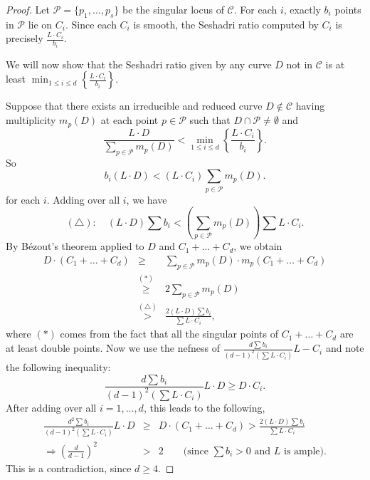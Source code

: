 \documentclass[12pt,reqno]{amsart}
\theoremstyle{plain}
\numberwithin{equation}{section}
\theoremstyle{definition}
\begin{document}
	\begin{proof}
	 Let $\mathcal{P} = \{p_{1}, \ldots, p_{s}\}$ be the singular locus of  $\mathcal{C}$. For each $i$, exactly $b_i$ points in $\mathcal{P}$  lie on $C_i$. Since each $C_i$ is smooth, the Seshadri ratio computed by $C_i$ is precisely 
	  $ \frac{L\cdot C_i}{b_i}$. %
	 

  We will now show that the Seshadri ratio given by any curve $D$ not in $\mathcal{C}$ is at least $\min_{1\le i\le d}
  {\left\{\frac{L\cdot C_i}{b_i}\right\}}$. 
  
	 Suppose that there exists an irreducible and reduced curve $D\notin \mathcal{C}$ having multiplicity $m_{p}(D)$ at each point $p \in \mathcal{P}$ such that $D \cap \mathcal{P} \ne \emptyset$ and 
		$$\frac{L \cdot D}{\sum_{p \in \mathcal{P}} m_{p}(D)} < \min_{1\le i \le d}\left\{\frac{L\cdot C_i}{b_i}\right\}.$$
So 
                $$b_i(L \cdot D)  < (L\cdot C_i) \sum_{p \in \mathcal{P}} m_{p}(D).$$ for each $i$. 
Adding over all $i$, we have 
		$$(\triangle) : \quad (L \cdot D)\sum b_i < \left(\sum_{p \in \mathcal{P}} m_{p}(D)\right)\sum L\cdot C_i.$$
		By B\'ezout's theorem applied to $D$ and $C_1+\dots+C_d$, we obtain
		\begin{eqnarray*}
		 D\cdot (C_{1}+ \ldots + C_{d}) &\geq& \sum_{p \in \mathcal{P}}m_{p}(D)\cdot m_{p}(C_{1}+ \ldots + C_{d})\\
		&\stackrel{(*)}{\geq}& 2\sum_{p \in \mathcal{P}} m_{p}(D) \\
		&\stackrel{(\triangle)}{>}& \frac{2(L \cdot D)\sum b_i}{\sum L\cdot C_i},
		\end{eqnarray*}
		where $(*)$ comes from the fact that all the singular points of $C_{1}+ \ldots + C_{d}$ are at least double points. Now we use the nefness 
		of $\frac{d\sum b_i}{(d-1)^2(\sum L\cdot C_i)}L-C_i$ and note the following  inequality: 
		\[
		\frac{d\sum b_i}{(d-1)^2(\sum L\cdot C_i)}L\cdot D \geq D\cdot C_i.
		\] 
		After adding over all $i=1,...,d$, this leads to the following, 
		\begin{eqnarray*}
			\frac{d^2\sum b_i}{(d-1)^2(\sum L\cdot C_i)}L\cdot D &\geq&  D\cdot (C_{1}+ \ldots + C_{d}) > \frac{2(L \cdot D)\sum b_i}{\sum L\cdot C_i} \\
			\Rightarrow \left(\frac{d}{d-1} \right)^2 &>& 2 \quad \quad \text{(since $\sum b_i > 0$ and $L$ is ample)}.
		\end{eqnarray*}
		This is a contradiction, since $d\geq 4$.
	\end{proof}
\end{document}
